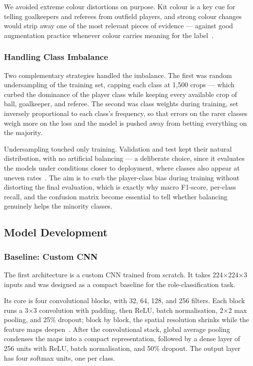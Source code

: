 \documentclass[preprint,12pt]{elsarticle}
\begin{document}
We avoided extreme colour distortions on purpose. Kit colour is a key cue for telling goalkeepers and referees from outfield players, and strong colour changes would strip away one of the most relevant pieces of evidence --- against good augmentation practice whenever colour carries meaning for the label~\cite{lewy2023augmentation}.

\subsubsection{Handling Class Imbalance}

Two complementary strategies handled the imbalance. The first was random undersampling of the training set, capping each class at 1,500 crops --- which curbed the dominance of the player class while keeping every available crop of ball, goalkeeper, and referee. The second was class weights during training, set inversely proportional to each class's frequency, so that errors on the rarer classes weigh more on the loss and the model is pushed away from betting everything on the majority.

Undersampling touched only training. Validation and test kept their natural distribution, with no artificial balancing --- a deliberate choice, since it evaluates the models under conditions closer to deployment, where classes also appear at uneven rates~\cite{ghosh2024imbalance}. The aim is to curb the player-class bias during training without distorting the final evaluation, which is exactly why macro F1-score, per-class recall, and the confusion matrix become essential to tell whether balancing genuinely helps the minority classes.

\subsection{Model Development}

\subsubsection{Baseline: Custom CNN}

The first architecture is a custom CNN trained from scratch. It takes 224$\times$224$\times$3 inputs and was designed as a compact baseline for the role-classification task.

Its core is four convolutional blocks, with 32, 64, 128, and 256 filters. Each block runs a 3$\times$3 convolution with padding, then ReLU, batch normalisation, 2$\times$2 max pooling, and 25\% dropout; block by block, the spatial resolution shrinks while the feature maps deepen~\cite{ioffe2015batch,srivastava2014dropout}. After the convolutional stack, global average pooling condenses the maps into a compact representation, followed by a dense layer of 256 units with ReLU, batch normalisation, and 50\% dropout. The output layer has four softmax units, one per class.
\end{document}
